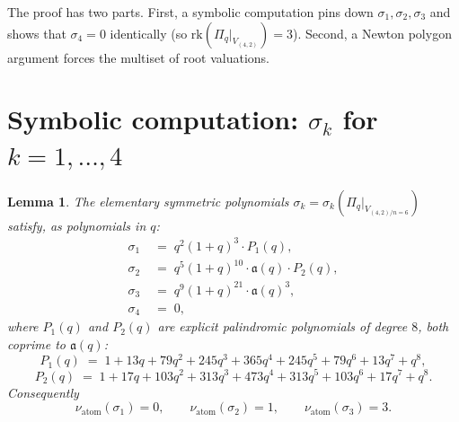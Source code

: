 \documentclass[11pt]{article}
\theoremstyle{plain}
\newtheorem{lemma}[theorem]{Lemma}
\theoremstyle{definition}
\theoremstyle{remark}
\newcommand{\Pibs}{\Pi_q}
\newcommand{\rk}{\mathrm{rk}}
\newcommand{\val}{\nu_{\mathrm{atom}}}
\newcommand{\atom}{\mathfrak{a}}
\begin{document}
The proof has two parts.  First, a symbolic computation pins down
$\sigma_1, \sigma_2, \sigma_3$ and shows that $\sigma_4 = 0$ identically (so
$\rk(\Pibs|_{V_{(4,2)}}) = 3$).  Second, a Newton polygon argument forces the
multiset of root valuations.

\section{Symbolic computation: $\sigma_k$ for $k = 1,\ldots,4$}

\begin{lemma}
\label{lem:sigma}
The elementary symmetric polynomials $\sigma_k = \sigma_k(\Pibs|_{V_{(4,2)/n=6}})$
satisfy, as polynomials in $q$:
\begin{align}
\sigma_1 &\;=\; q^2(1+q)^3 \cdot P_1(q), \label{eq:sigma1} \\
\sigma_2 &\;=\; q^5(1+q)^{10} \cdot \atom(q) \cdot P_2(q), \label{eq:sigma2} \\
\sigma_3 &\;=\; q^9(1+q)^{21} \cdot \atom(q)^3, \label{eq:sigma3} \\
\sigma_4 &\;=\; 0, \label{eq:sigma4}
\end{align}
where $P_1(q)$ and $P_2(q)$ are explicit palindromic polynomials of degree $8$,
both coprime to $\atom(q)$:
\[ P_1(q) \;=\; 1 + 13q + 79q^2 + 245q^3 + 365q^4 + 245q^5 + 79q^6 + 13q^7 + q^8, \]
\[ P_2(q) \;=\; 1 + 17q + 103q^2 + 313q^3 + 473q^4 + 313q^5 + 103q^6 + 17q^7 + q^8. \]
Consequently
\[ \val(\sigma_1) = 0, \qquad \val(\sigma_2) = 1, \qquad \val(\sigma_3) = 3. \]
\end{lemma}
\end{document}
